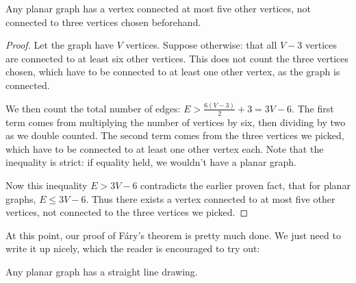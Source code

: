 \documentclass[11pt,paper=letter]{scrartcl}
\begin{document}
\begin{problem}
Any planar graph has a vertex connected at most five other vertices, not connected to three vertices chosen beforehand.
\end{problem}

\begin{proof}
Let the graph have $V$ vertices. Suppose otherwise: that all $V-3$ vertices are connected to at least six other vertices. This does not count the three vertices chosen, which have to be connected to at least one other vertex, as the graph is connected.

We then count the total number of edges: $E > \frac{6(V-3)}{2} + 3 = 3V - 6$. The first term comes from multiplying the number of vertices by six, then dividing by two as we double counted. The second term comes from the three vertices we picked, which have to be connected to at least one other vertex each. Note that the inequality is strict: if equality held, we wouldn't have a planar graph.

Now this inequality $E > 3V - 6$ contradicts the earlier proven fact, that for planar graphs, $E \leq 3V - 6$. Thus there exists a vertex connected to at most five other vertices, not connected to the three vertices we picked.
\end{proof}

At this point, our proof of F\'{a}ry's theorem is pretty much done. We just need to write it up nicely, which the reader is encouraged to try out:

\begin{problem}[F\'{a}ry's theorem]
Any planar graph has a straight line drawing.
\end{problem}
\end{document}
